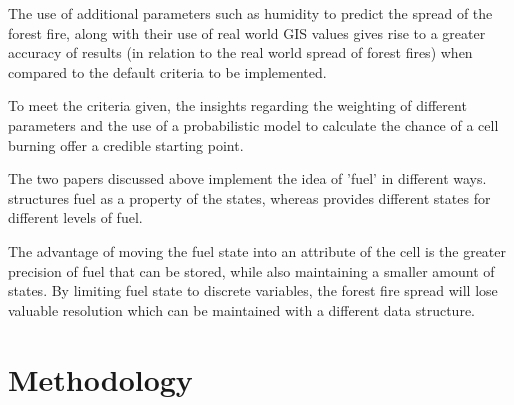 \documentclass[11pt, a4paper, titlepage]{article}
\begin{document}
  
    

  
  
  
  
  

  The use of additional parameters such as humidity to predict the spread of the forest fire, along with their use of real world GIS values gives rise to a greater accuracy of results (in relation to the real world spread of forest fires) when compared to the default criteria to be implemented.

  To meet the criteria given, the insights regarding the weighting of different parameters and the use of a probabilistic model to calculate the chance of a cell burning offer a credible starting point.

  The two papers discussed above implement the idea of 'fuel' in different ways. \cite{ALEXANDRIDIS2008191} structures fuel as a property of the states, whereas \cite{HERNANDEZENCINAS20071213} provides different states for different levels of fuel. 
  
  The advantage of moving the fuel state into an attribute of the cell is the greater precision of fuel that can be stored, while also maintaining a smaller amount of states. By limiting fuel state to discrete variables, the forest fire spread will lose valuable resolution which can be maintained with a different data structure.
\section{Methodology}
\end{document}
